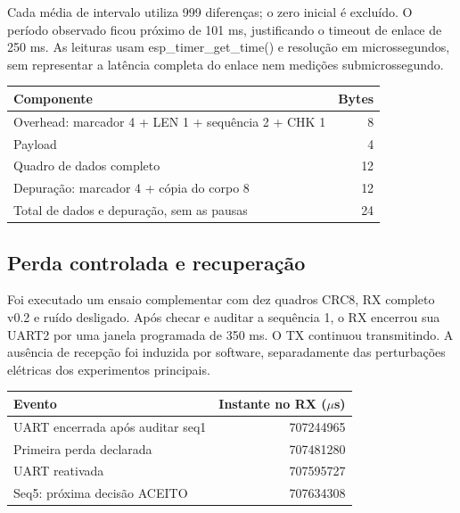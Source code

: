 \documentclass[12pt,a4paper]{article}
\begin{document}
Cada média de intervalo utiliza 999 diferenças; o zero inicial é excluído. O período observado ficou próximo de 101 ms, justificando o timeout de enlace de 250 ms. As leituras usam esp\_timer\_get\_time() e resolução em microssegundos, sem representar a latência completa do enlace nem medições submicrossegundo.


\par\smallskip\noindent\begin{minipage}{\textwidth}\centering\small
{}
\begin{tabularx}{\textwidth}{@{}Y r@{}}\toprule
\textbf{Componente} & \textbf{Bytes}\\\midrule
Overhead: marcador 4 + LEN 1 + sequência 2 + CHK 1 & 8\\
Payload & 4\\
Quadro de dados completo & 12\\
Depuração: marcador 4 + cópia do corpo 8 & 12\\
Total de dados e depuração, sem as pausas & 24\\
\bottomrule\end{tabularx}
\par{}\end{minipage}\par\smallskip

\FloatBarrier
\clearpage
\subsection{Perda controlada e recuperação}
Foi executado um ensaio complementar com dez quadros CRC8, RX completo v0.2 e ruído desligado. Após checar e auditar a sequência 1, o RX encerrou sua UART2 por uma janela programada de 350 ms. O TX continuou transmitindo. A ausência de recepção foi induzida por software, separadamente das perturbações elétricas dos experimentos principais.


\par\smallskip\noindent\begin{minipage}{\textwidth}\centering\small
{}
\begin{tabularx}{\textwidth}{@{}Y r@{}}\toprule
\textbf{Evento} & \textbf{Instante no RX (\ensuremath{\mu}s)}\\\midrule
UART encerrada após auditar seq1 & 707244965\\
Primeira perda declarada & 707481280\\
UART reativada & 707595727\\
Seq5: próxima decisão ACEITO & 707634308\\
\bottomrule\end{tabularx}
\par{}\end{minipage}\par\smallskip
\end{document}
